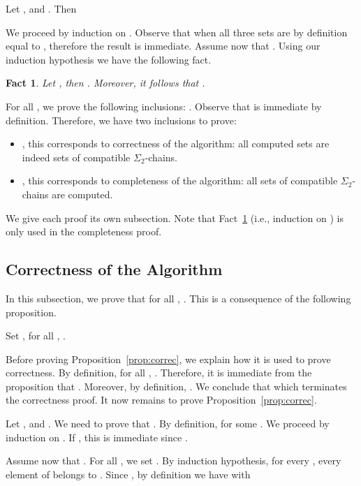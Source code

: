 \documentclass[envcountsame]{llncs}
\newcounter{sauvegarde}
\newcommand\adjustc[1]{\protect{\setcounter{sauvegarde}{\thetheorem}
  \setcounterref{theorem}{#1}
  \addtocounter{theorem}{-1}
}}
\newcommand\restorec{
\setcounter{theorem}{\thesauvegarde}
}
\newcommand{\sic}[1]{\ensuremath{\Sigma_{#1}}\xspace}
\newcommand\qchains[1]{\ensuremath{\sic{#1}}-chains\xspace}
\newcommand\dchains{\qchains{2}}
\newtheorem{fact}[theorem]{Fact}
\begin{document}
\adjustc{prop:compu}
\begin{proposition}
  Let ,  and . Then 
\end{proposition}
\restorec

We proceed by induction on . Observe that when  all three
sets are by definition equal to , therefore the result is
immediate. Assume now that . Using our induction hypothesis
we have the following fact.

\begin{fact} \label{fct:inducomp}
  Let , then . Moreover, it follows that .
\end{fact}



For all , we prove the following inclusions:
. Observe that  is immediate by definition. Therefore, we
have two inclusions to prove:
\begin{itemize}
\item , this corresponds to correctness of the
  algorithm: all computed sets are indeed sets of compatible
  \dchains. 
\item , this corresponds to completeness of the
  algorithm: all sets of compatible \dchains are computed.
\end{itemize}
\noindent
We give each proof its own subsection. Note that
Fact~\ref{fct:inducomp} (i.e., induction on ) is
only used in the completeness proof.

\subsection{Correctness of the Algorithm}
In this subsection, we prove that for all , . This is
a consequence of the following proposition.

\begin{proposition} \label{prop:correc}
  Set , for all , .
\end{proposition}

Before proving Proposition~\ref{prop:correc}, we explain how it is
used to prove correctness. By definition, for all ,
. Therefore, it is immediate from the
proposition that . Moreover, by definition, . We conclude that
 which 
terminates the correctness proof. It now remains to prove
Proposition~\ref{prop:correc}.

Let ,  and . We need to prove that . By
definition,  for some
. We proceed by induction on . If , this is immediate
since .

Assume now that . For all , we set . By induction hypothesis, for every
, every element of
 belongs to .
Since , by definition we have  with
\end{document}
